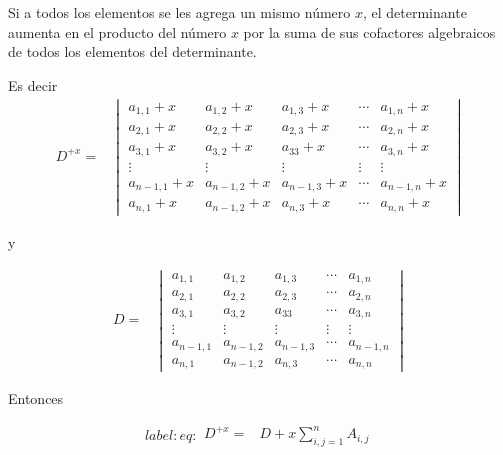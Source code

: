 \documentclass[
]{article}
\begin{document}
Si a todos los elementos se les agrega un mismo número \(x\), el
determinante aumenta en el producto del número \(x\) por la suma de sus
cofactores algebraicos de todos los elementos del determinante.

Es decir \begin{equation*}
\begin{array}{cc}
D^{+x} = &  \begin{vmatrix} 
          a_{1,1}+x     & a_{1,2}+x     & a_{1,3}+x      & \cdots     & a_{1,n}+x      \\ 
          a_{2,1}+x     & a_{2,2}+x     & a_{2,3}+x      & \cdots     & a_{2,n}+x      \\
          a_{3,1}+x     & a_{3,2}+x     & a_{33}+x       &  \cdots    & a_{3,n}+x      \\
          \vdots        & \vdots        & \vdots         & \vdots     & \vdots \\
          a_{n-1,1}+x   & a_{n-1,2}+x   & a_{n-1,3}+x    & \cdots     & a_{n-1,n}+x      \\
          a_{n,1}+x     & a_{n-1,2}+x   & a_{n,3}+x      & \cdots     & a_{n,n}+x
  \end{vmatrix}
\end{array}
\end{equation*}

y

\begin{equation*}
\begin{array}{cc}
D = &  \begin{vmatrix} 
          a_{1,1}    & a_{1,2}     & a_{1,3}      & \cdots     & a_{1,n}      \\ 
          a_{2,1}    & a_{2,2}     & a_{2,3}      & \cdots     & a_{2,n}      \\
          a_{3,1}    & a_{3,2}     & a_{33}       &  \cdots    & a_{3,n}      \\
          \vdots     & \vdots      & \vdots       & \vdots     & \vdots \\
          a_{n-1,1}  & a_{n-1,2}   & a_{n-1,3}    & \cdots     & a_{n-1,n}      \\
          a_{n,1}    & a_{n-1,2}   & a_{n,3}      & \cdots     & a_{n,n}
  \end{vmatrix}
\end{array}
\end{equation*}

Entonces

\begin{equation}{label:eq:}
\begin{array}{cc}
  D^{+x} = &  D + x \sum_{i,j=1}^{n} A_{i,j} 
\end{array}
\end{equation}
\end{document}
